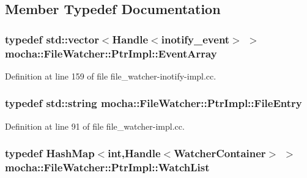 \subsection{Member Typedef Documentation}
\hypertarget{classmocha_1_1_file_watcher_1_1_ptr_impl_a0f2e577eda4e2979add6ae59a6c42c63}{
\subsubsection[{EventArray}]{\setlength{\rightskip}{0pt plus 5cm}typedef std::vector$<${\bf Handle}$<$inotify\_\-event$>$ $>$ {\bf mocha::FileWatcher::PtrImpl::EventArray}}}
\label{classmocha_1_1_file_watcher_1_1_ptr_impl_a0f2e577eda4e2979add6ae59a6c42c63}


Definition at line 159 of file file\_\-watcher-\/inotify-\/impl.cc.

\hypertarget{classmocha_1_1_file_watcher_1_1_ptr_impl_ac8da734014593b49abf0a45f97154ac6}{
\subsubsection[{FileEntry}]{\setlength{\rightskip}{0pt plus 5cm}typedef std::string {\bf mocha::FileWatcher::PtrImpl::FileEntry}}}
\label{classmocha_1_1_file_watcher_1_1_ptr_impl_ac8da734014593b49abf0a45f97154ac6}


Definition at line 91 of file file\_\-watcher-\/impl.cc.

\hypertarget{classmocha_1_1_file_watcher_1_1_ptr_impl_a978a55e79bd47e1b1d284d95d24ee61c}{
\subsubsection[{WatchList}]{\setlength{\rightskip}{0pt plus 5cm}typedef {\bf HashMap}$<$int,{\bf Handle}$<${\bf WatcherContainer}$>$ $>$ {\bf mocha::FileWatcher::PtrImpl::WatchList}}}
\label{classmocha_1_1_file_watcher_1_1_ptr_impl_a978a55e79bd47e1b1d284d95d24ee61c}


